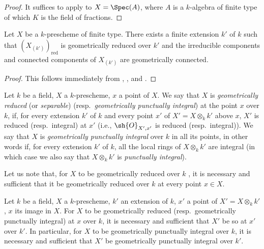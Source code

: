 \begin{proof}
It suffices to apply  to $X=\Spec(A)$, where $A$ is a $k$-algebra of finite type of which $K$ is the field of fractions.
\end{proof}

\begin{corollary}[4.6.8]
\label{IV.4.6.8}
Let $X$ be a $k$-prescheme of finite type.
There exists a finite extension $k'$ of $k$ such that $(X_{(k')})_{\mathrm{red}}$ is geometrically reduced over $k'$ and the irreducible components and connected components of $X_{(k')}$ are geometrically connected.
\end{corollary}

\begin{proof}
This follows immediately from , , and .
\end{proof}

\begin{definition}[4.6.9]
\label{IV.4.6.9}
Let $k$ be a field, $X$ a $k$-prescheme, $x$ a point of $X$.
We say that $X$ is \emph{geometrically reduced} (or \emph{separable}) (resp.\ \emph{geometrically punctually integral}) at the point $x$ over $k$, if, for every extension $k'$ of $k$ and every point $x'$ of $X'=X\otimes_k k'$ above $x$, $X'$ is reduced (resp.\ integral) at $x'$ (i.e., $\sh{O}_{X',x'}$ is reduced (resp.\ integral)).
We say that $X$ is \emph{geometrically punctually integral} over $k$ in all its points, in other words if, for every extension $k'$ of $k$, all the local rings of $X\otimes_k k'$ are integral (in which case we also say that $X\otimes_k k'$ is \emph{punctually integral}).
\end{definition}

Let us note that, for $X$ to be geometrically reduced over $k$ , it is necessary and sufficient that it be geometrically reduced over $k$ at every point $x\in X$.

\begin{proposition}[4.6.10]
\label{IV.4.6.10}
Let $k$ be a field, $X$ a $k$-prescheme, $k'$ an extension of $k$, $x'$ a point of $X'=X\otimes_k k'$, $x$ its image in $X$.
For $X$ to be geometrically reduced (resp.\ geometrically punctually integral) at $x$ over $k$, it is necessary and sufficient that $X'$ be so at $x'$ over $k'$.
In particular, for $X$ to be geometrically punctually integral over $k$, it is necessary and sufficient that $X'$ be geometrically punctually integral over $k'$.
\end{proposition}

